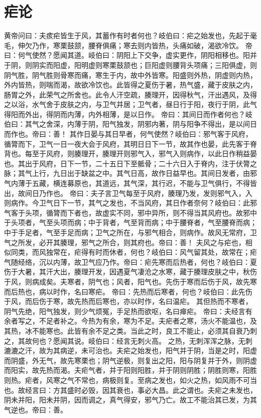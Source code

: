 \documentclass[a4paper,12pt,UTF8,twoside]{ctexbook}
\begin{document}
\chapter{疟论}
黄帝问曰：夫痎疟皆生于风，其蓄作有时者何也？岐伯曰：疟之始发也，先起于毫毛，伸欠乃作，寒栗鼓颔，腰脊俱痛；寒去则内皆热，头痛如破，渴欲冷饮。
帝曰：何气使然？愿闻其道。岐伯曰：阴阳上下交争，虚实更作，阴阳相移也。阳并于阴，则阴实而阳虚，阳明虚则寒栗鼓颔也；巨阳虚则腰背头项痛；三阳俱虚，则阴气胜，阴气胜则骨寒而痛，寒生于内，故中外皆寒。阳盛则外热，阴虚则内热，外内皆热，则喘而渴，故欲冷饮也。此皆得之夏伤于暑，热气盛，藏于皮肤之内，肠胃之外，此荣气之所舍也。此令人汗空疏，腠理开，因得秋气，汗出遇风，及得之以浴，水气舍于皮肤之内，与卫气并居；卫气者，昼日行于阳，夜行于阴，此气得阳而外出，得阴而内薄，内外相薄，是以日作。
帝曰：其间日而作者何也？岐伯曰：其气之舍深，内薄于阴，阳气独发，阴邪内著，阴与阳争不得出，是以间日而作也。帝曰：善！
其作日晏与其日早者，何气使然？岐伯曰：邪气客于风府，循膂而下，卫气一日一夜大会于风府，其明日日下一节，故其作也晏，此先客于脊背也。每至于风府，则腠理开，腠理开则邪气入，邪气入则病作，以此日作稍益晏也。其出于风府，日下一节，二十五日下至骶骨；二十六日入于脊内，注于伏膂之脉；其气上行，九日出于缺盆之中。其气日高，故作日益早也。其间日发者，由邪气内薄于五藏，横连募原也，其道远，其气深，其行迟，不能与卫气俱行，不得皆出，故间日乃作也。
帝曰：夫子言卫气每至于风府，腠理乃发，发则邪气入，入则病作。今卫气日下一节，其气之发也，不当风府，其日作者奈何？岐伯曰：此邪气客于头项，循膂而下者也，故虚实不同，邪中异所，则不得当其风府也。故邪中于头项者，气至头项而病；中于背者，气至背而病；中于腰脊者，气至腰脊而病；中于手足者，气至手足而病；卫气之所在，与邪气相合，则病作。故风无常府，卫气之所发，必开其腠理，邪气之所合，则其府也。帝曰：善！
夫风之与疟也，相似同类，而风独常在，疟得有时而休者，何也？岐伯曰：风气留其处，故常在；疟气随经络，沉以内薄，故卫气应乃作。帝曰：疟先寒而后热者，何也？岐伯曰：夏伤于大暑，其汗大出，腠理开发，因遇夏气凄沧之水寒，藏于腠理皮肤之中，秋伤于风，则病成矣。夫寒者，阴气也；风者，阳气也。先伤于寒而后伤于风，故先寒而后热也，病以时作，名曰寒疟。
帝曰：先热而后寒者，何也？岐伯曰：此先伤于风，而后伤于寒，故先热而后寒也，亦以时作，名曰温疟。
其但热而不寒者，阴气先绝，阳气独发，则少气烦冤，手足热而欲呕，名曰瘅疟。
帝曰：夫经言有余者写之，不足者补之。今热为有余，寒为不足。夫疟者之寒，汤火不能温也，及其热，冰不能寒也。此皆有余不足之类。当此之时，良工不能止，必须其自衰乃刺之，其故何也？愿闻其说。岐伯曰：经言无刺火高。
之热，无刺浑浑之脉，无刺漉漉之汗，故为其病逆，未可治也。夫疟之始发也，阳气并于阴，当是之时，阳虚而阴盛，外无气，故先寒栗也；阴气逆极，则复出之阳，阳与阴复并于外，则阴虚而阳实，故先热而渴。夫疟气者，并于阳则阳胜，并于阴则阴胜；阴胜则寒，阳胜则热。疟者，风寒之气不常也，病极则复。至病之发也，如火之热，如风雨不可当也。故经言曰：方其盛时必毁，因其衰也，事必大昌。此之谓也。夫疟之未发也，阴未并阳，阳未并阴，因而调之，真气得安，邪气乃亡。故工不能治其已发，为其气逆也。帝曰：善。
\end{document}
